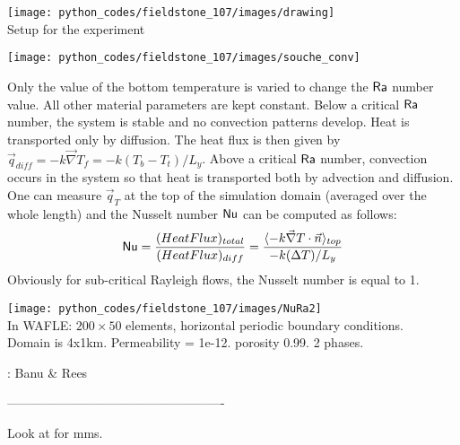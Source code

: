 \begin{center}
\texttt{[image: python\_codes/fieldstone\_107/images/drawing]}\\
{\captionfont Setup for the experiment}
\end{center}

\begin{center}
\texttt{[image: python\_codes/fieldstone\_107/images/souche\_conv]}
\end{center}

Only the value of the bottom temperature is varied to change the ${\mathsf{Ra}}$ number value. 
All other material parameters are kept constant.
Below a critical ${\mathsf{Ra}}$ number, the system is stable and no convection patterns develop. Heat 
is transported only by diffusion.
The heat flux is then given by $\vec{q}_{diff}=-k \vec{\nabla} T_f=-k (T_b-T_t)/L_y$.
Above a critical ${\mathsf{Ra}}$ number, convection occurs in the system so that heat is transported 
both by advection and diffusion. 
One can measure $\vec{q}_T$ at the top of the simulation domain (averaged over the whole length) and 
the Nusselt number ${\mathsf{Nu}}$ can be computed as follows:
\[
{\mathsf{Nu}}=\frac{(Heat Flux)_{total}}{(Heat Flux)_{diff}} 
= \frac{\langle - k \vec{\nabla}T \cdot \vec{n}\rangle_{top}}{ -k (\Delta T)/L_y}
\]
Obviously for sub-critical Rayleigh flows, the Nusselt number is equal to 1. 

\begin{center}
\texttt{[image: python\_codes/fieldstone\_107/images/NuRa2]}\\
In WAFLE: $200 \times 50$ elements, horizontal periodic boundary conditions.\\ Domain is 4x1km. Permeability = 1e-12. porosity 0.99. 2 phases.  
\end{center}


\Literature: Banu \& Rees \cite{bare02}



----------------------------------------------------

Look at \textcite{buha06,buha07} for mms.
